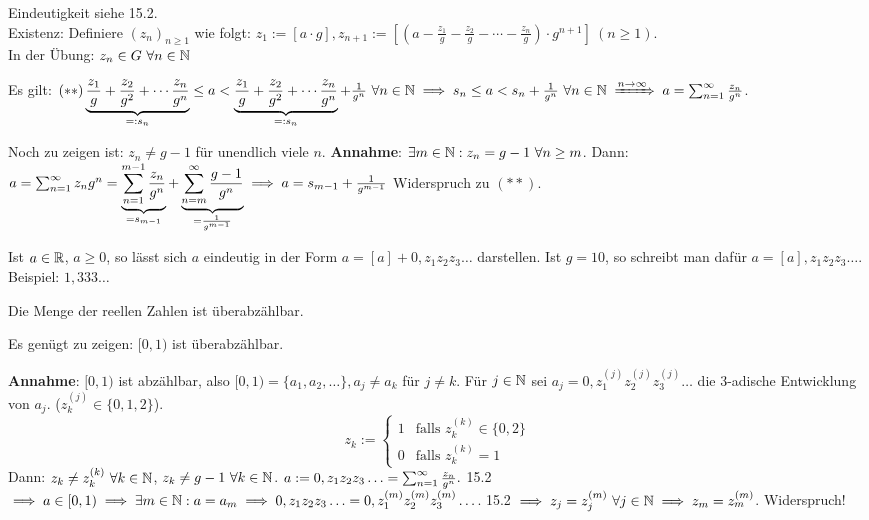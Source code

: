 \documentclass[a4paper,oneside,DIV15,BCOR12mm]{scrbook}
\begin{document}
\begin{beweis}
Eindeutigkeit siehe 15.2.\\
Existenz: Definiere $(z_n)_{n\ge1}$ wie folgt: $z_1:=[a\cdot g], z_{n+1} := [ ( a - \frac{z_1}{g} - \frac{z_2}{g} - \cdots -\frac{z_n}{g}) \cdot g^{n+1} ] \ (n\ge1)$. \\
In der Übung: $z_n \in G \ \forall n\in\mathbb{N}$

Es gilt: $(**) \underbrace{\frac{z_1}{g} + \frac{z_2}{g^2} + \cdots \frac{z_n}{g^n}}_{=: s_n} \le a < \underbrace{\frac{z_1}{g} + \frac{z_2}{g^2} + \cdots \frac{z_n}{g^n}}_{=: s_n} + \frac{1}{g^n} \ \forall n\in\MdN \folgt s_n \le a < s_n + \frac{1}{g^n} \ \forall n\in\MdN \folgtwegen{n\to\infty} a = \reihe{\frac{z_n}{g^n}}$.

Noch zu zeigen ist: $z_n \ne g-1$ für unendlich viele $n$.
\textbf{Annahme}: $\exists{m\in\ensuremath{\mathbb{N}}}: z_n = g-1 \ \forall n\ge m$.  Dann: $a = \sum_{n=1}^{\infty}{z_n}{g^n} = \underbrace{\sum_{n=1}^{m-1}{\frac{z_n}{g^n}}}_{= s_{m-1}} + \underbrace{\sum_{n=m}^\infty{\frac{g-1}{g^n}}}_{= \frac{1}{g^{m-1}}} \implies a = s_{m-1} + \frac{1}{g^{m-1}}$ Widerspruch zu $(**)$.
\end{beweis}

\begin{bemerkung}
Ist $a\in\mathbb{R}$, $a\ge0$, so lässt sich $a$ eindeutig in der Form $a = [a]+0,z_1z_2z_3\ldots$ darstellen. Ist $g=10$, so schreibt man dafür $a=[a],z_1z_2z_3\ldots$. Beispiel: $1,333\ldots$
\end{bemerkung}

\begin{satz}
Die Menge der reellen Zahlen ist überabzählbar.
\end{satz}

\begin{beweis}
Es genügt zu zeigen: $[0,1)$ ist überabzählbar.

\textbf{Annahme}: $[0,1)$ ist abzählbar, also $[0,1) = \{a_1,a_2,\ldots\}, a_j \ne a_k$ für $j\ne k$. 
Für $j \in\mathbb{N}$ sei $a_j = 0,z_1^{(j)} z_2^{(j)} z_3^{(j)}\ldots$ die 3-adische Entwicklung von $a_j$. ($z_k^{(j)} \in \{0,1,2\}$).
$$ z_k := \begin{cases} 1 & \text{falls } z_k^{(k)} \in \{0,2\} \\0 & \text{falls } z_k^{(k)}= 1 \end{cases}$$
Dann: $z_k \ne z_k^{(k)} \ \forall k \in\mathbb{N}$, $z_k \ne g-1 \ \forall k\in\mathbb{N}$. $a := 0,z_1z_2z_3\ldots = \sum_{n=1}^{\infty}{\frac{z_n}{g^n}}.$ 15.2 $\implies a \in [0,1) \implies \exists m\in\mathbb{N}: a= a_m \implies 0,z_1z_2z_3\ldots = 0,z_1^{(m)}z_2^{(m)}z_3^{(m)}\ldots$. 15.2 $\implies z_j = z_j^{(m)} \ \forall j\in\mathbb{N} \implies z_m = z_m^{(m)}$. Widerspruch!
\end{beweis}
\end{document}
